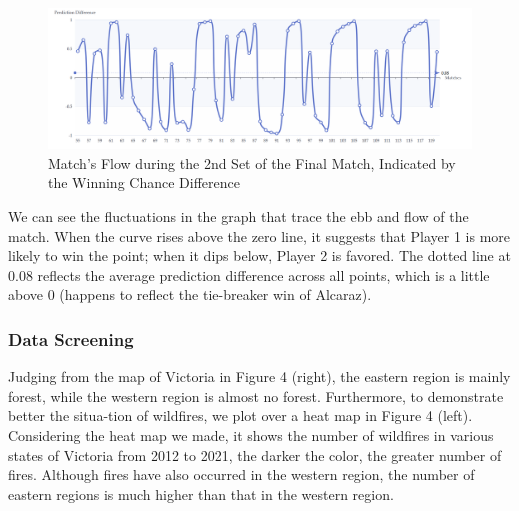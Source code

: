 \documentclass[12pt]{article}  %
\begin{document}
\begin{figure}[htbp]  %
	\centering  %
	\includegraphics[width=.8\textwidth]{prediction-difference.png} %
	\caption{Match's Flow during the 2nd Set of the Final Match, Indicated by the Winning Chance Difference} %
\end{figure}

We can see the fluctuations in the graph that trace the ebb and flow of the match. When the curve rises above the zero line, it suggests that Player 1 is more likely to win the point; when it dips below, Player 2 is favored. The dotted line at 0.08 reflects the average prediction difference across all points, which is a little above 0 (happens to reflect the tie-breaker win of Alcaraz).

\subsubsection{Data Screening}
Judging from the map of Victoria in Figure 4 (right), the eastern region is mainly forest, while the western region is almost no forest. Furthermore, to demonstrate better the situa-tion of wildfires, we plot over a heat map in Figure 4 (left).
Considering the heat map we made, it shows the number of wildfires in various states of Victoria from 2012 to 2021, the darker the color, the greater number of fires. Although fires have also occurred in the western region, the number of eastern regions is much higher than that in the western region. 
\end{document}

